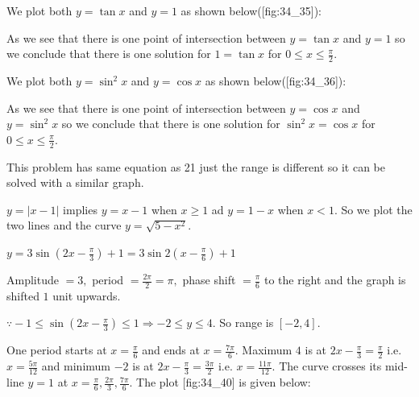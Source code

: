 \item We plot both $y = \tan x$ and $y = 1$ as shown below([fig:34_35]):

  \startplacefigure[title={Plot of $\tan x$ and $y = 1$}, reference=fig:34_35]
    \externalfigure[34_35.pdf]
  \stopplacefigure
  As we see that there is one point of intersection between $y = \tan x$ and $y = 1$ so we
  conclude that there is one solution for $1 = \tan x$ for $0\leq x\leq\frac{\pi}{2}$.

\item We plot both $y = \sin^2x$ and $y = \cos x$ as shown below([fig:34_36]):

  \startplacefigure[title={Plot of $\sin^2 x$ and $\cos x$}, reference=fig:34_36]
    \externalfigure[34_36.pdf]
  \stopplacefigure

  As we see that there is one point of intersection between $y = \cos x$ and $y = \sin^2x$ so we
  conclude that there is one solution for $\sin^2x = \cos x$ for $0\leq x\leq\frac{\pi}{2}$.

\item This problem has same equation as 21 just the range is different so it can be solved with a
  similar graph.

\item $y = |x - 1|$ implies $y = x - 1$ when $x \geq 1$ ad $y = 1 - x$ when $x <
    1$. So we plot the two lines and the curve $y = \sqrt{5 - x^2}$.

  \startplacefigure[reference=fig:34_38]
    \externalfigure[34_38.pdf]
  \stopplacefigure

\item $y = 3\sin\left(2x - \frac{\pi}{3}\right) + 1 = 3\sin2\left(x - \frac{\pi}{6}\right) + 1$

  Amplitude $= 3,$ period $= \frac{2\pi}{2} = \pi,$ phase shift $= \frac{\pi}{6}$ to the right and the graph is shifted
  $1$ unit upwards.

  $\because -1\leq \sin\left(2x - \frac{\pi}{3}\right)\leq 1 \Rightarrow -2\leq y\leq 4.$ So range is $[-2, 4].$

  One period starts at $x = \frac{\pi}{6}$ and ends at $x = \frac{7\pi}{6}.$ Maximum $4$ is at $2x - \frac{\pi}{3} =
  \frac{\pi}{2}$ i.e. $x = \frac{5\pi}{12}$ and minimum $-2$ is at $2x - \frac{\pi}{3} = \frac{3\pi}{2}$ i.e. $x =
  \frac{11\pi}{12}.$ The curve crosses its mid-line $y = 1$ at $x = \frac{\pi}{6}, \frac{2\pi}{3}, \frac{7\pi}{6}.$ The
  plot [fig:34_40] is given below:

